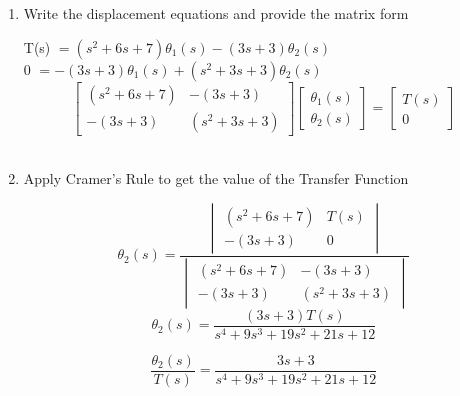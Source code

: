 ﻿\documentclass[11pt]{article}
\begin{document}
\begin{enumerate}[label=(\alph*),itemindent=*, leftmargin=*, nolistsep]
\vspace{15pt}
    \item Write the displacement equations and provide the matrix form
\begin{center}
    T(s) $= (s^2 + 6s + 7)\theta_1(s) - (3s + 3)\theta_2(s)$\\
    0 $= -(3s + 3)\theta_1(s) + (s^2 + 3s + 3)\theta_2(s)$\\
    \[
        \begin{bmatrix}
        (s^2 + 6s + 7) & -(3s + 3) \\
        -(3s + 3) & (s^2 + 3s + 3)
        \end{bmatrix}
        \begin{bmatrix}
        \theta_1(s) \\
        \theta_2(s)
        \end{bmatrix}
        =
        \begin{bmatrix}
        T(s)\\
        0
        \end{bmatrix}
    \]\\
\end{center}
\vspace{15pt}
    \item Apply Cramer's Rule to get the value of the Transfer Function
\begin{center}
    \[
        \theta_2(s) = 
            \frac{\begin{vmatrix}
                (s^2 + 6s + 7) & T(s)\\
                -(3s + 3) & 0
            \end{vmatrix}
        }{\begin{vmatrix}
                (s^2 + 6s + 7) & -(3s + 3) \\
                -(3s + 3) & (s^2 + 3s + 3)
            \end{vmatrix}
        }
    \]
    \[
    \theta_2(s) = \frac{(3s+3)T(s)}{s^4 + 9s^3 + 19s^2 + 21s + 12}
    \] 

    \[
    \boxed{\frac{\theta_2(s)}{T(s)} = \frac{3s+3}{s^4 + 9s^3 + 19s^2 + 21s + 12}}
    \] 

\end{center}
\end{enumerate}

\end{document}
